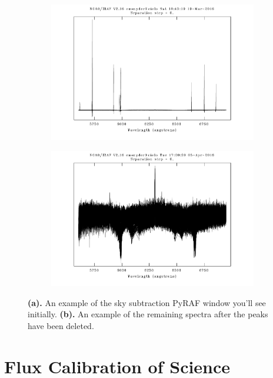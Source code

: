 \documentclass[12pt]{report}
\begin{document}
\begin{figure}[t]
\centering
\begin{subfigure}[t]{0.49\textwidth}
\includegraphics[width=\textwidth]{skysub_before}
\end{subfigure}
\hfill
\begin{subfigure}[t]{0.49\textwidth}
\includegraphics[width=\textwidth]{newskysubexample}
\end{subfigure}
\caption[Examples of sky subtraction]{\textbf{(a).} An example of the sky subtraction PyRAF window you'll see initially. \textbf{(b).} An example of the remaining spectra after the peaks have been deleted.}
\label{fig:skysub}
\end{figure}

\section{Flux Calibration of Science}
\end{document}
